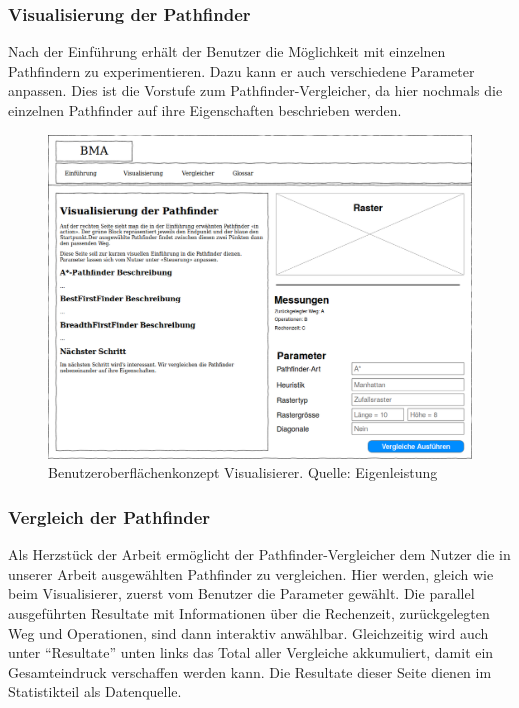 \documentclass[12pt,a4paper,german]{report}
\begin{document}
\subsubsection{Visualisierung der Pathfinder}
Nach der Einführung erhält der Benutzer die Möglichkeit mit einzelnen Pathfindern zu experimentieren. Dazu kann er auch verschiedene Parameter anpassen. Dies ist die Vorstufe zum Pathfinder-Vergleicher, da hier nochmals die einzelnen Pathfinder auf ihre Eigenschaften beschrieben werden.
\begin{figure}[H]
  \centering
  \includegraphics[width=16cm]{visualisierung1}
  \caption[Benutzeroberflächenkonzept des Pathfinding-Visualisierers.]{Benutzeroberflächenkonzept Visualisierer. Quelle: Eigenleistung}
  \label{fig:gui_konzept_visualizer}
\end{figure}

\clearpage

\subsubsection{Vergleich der Pathfinder}
Als Herzstück der Arbeit ermöglicht der Pathfinder-Vergleicher dem Nutzer die in unserer Arbeit ausgewählten Pathfinder zu vergleichen. Hier werden, gleich wie beim Visualisierer, zuerst vom Benutzer die Parameter gewählt. Die parallel ausgeführten Resultate mit Informationen über die Rechenzeit, zurückgelegten Weg und Operationen, sind dann interaktiv anwählbar. Gleichzeitig wird auch unter ``Resultate'' unten links das Total aller Vergleiche akkumuliert, damit ein Gesamteindruck verschaffen werden kann. Die Resultate dieser Seite dienen im Statistikteil als Datenquelle.
\end{document}
